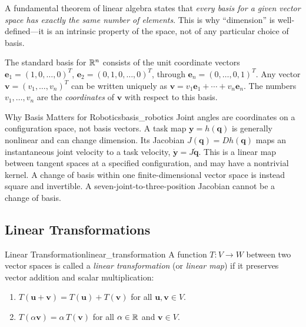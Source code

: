 A fundamental theorem of linear algebra states that \emph{every basis for a given vector space has exactly the same number of elements}. This is why ``dimension'' is well-defined---it is an intrinsic property of the space, not of any particular choice of basis.

The standard basis for $\mathbb{R}^n$ consists of the unit coordinate vectors $\mathbf{e}_1 = (1, 0, \ldots, 0)^T$, $\mathbf{e}_2 = (0, 1, 0, \ldots, 0)^T$, through $\mathbf{e}_n = (0, \ldots, 0, 1)^T$. Any vector $\mathbf{v} = (v_1, \ldots, v_n)^T$ can be written uniquely as $\mathbf{v} = v_1 \mathbf{e}_1 + \cdots + v_n \mathbf{e}_n$. The numbers $v_1, \ldots, v_n$ are the \emph{coordinates} of $\mathbf{v}$ with respect to this basis.

\begin{laymansbox}{Why Basis Matters for Robotics}{basis_robotics}
Joint angles are coordinates on a configuration space, not basis vectors. A task map $\mathbf y=h(\mathbf q)$ is generally nonlinear and can change dimension. Its Jacobian $J(\mathbf q)=Dh(\mathbf q)$ maps an instantaneous joint velocity to a task velocity, $\dot{\mathbf y}=J\dot{\mathbf q}$. This is a linear map between tangent spaces at a specified configuration, and may have a nontrivial kernel. A change of basis within one finite-dimensional vector space is instead square and invertible. A seven-joint-to-three-position Jacobian cannot be a change of basis.

\end{laymansbox}

\subsection{Linear Transformations}
\label{subsec:linear_transformations}

\begin{definition}{Linear Transformation}{linear_transformation}
A function $T: V \to W$ between two vector spaces is called a \emph{linear transformation} (or \emph{linear map}) if it preserves vector addition and scalar multiplication:
\begin{enumerate}[label=(\roman*)]
    \item $T(\mathbf{u} + \mathbf{v}) = T(\mathbf{u}) + T(\mathbf{v})$ for all $\mathbf{u}, \mathbf{v} \in V$.
    \item $T(\alpha \mathbf{v}) = \alpha \, T(\mathbf{v})$ for all $\alpha \in \mathbb{R}$ and $\mathbf{v} \in V$.
\end{enumerate}
\end{definition}

